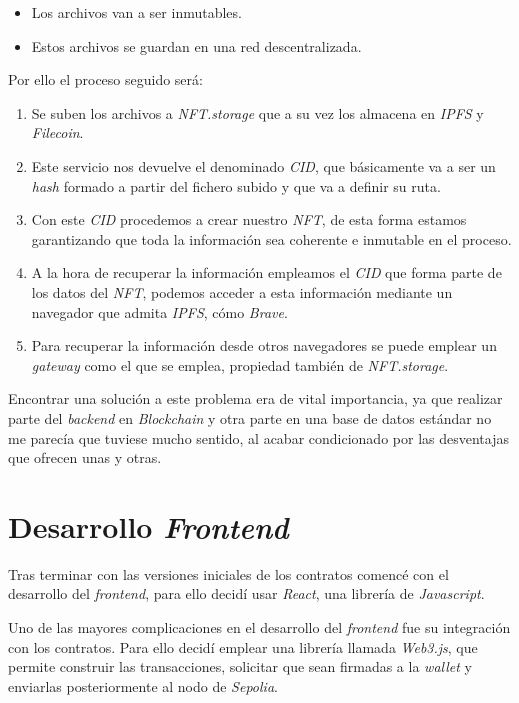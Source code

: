 \begin{itemize}
    \item Los archivos van a ser inmutables.
    \item Estos archivos se guardan en una red descentralizada.
\end{itemize}

Por ello el proceso seguido será:

\begin{enumerate}
    \item Se suben los archivos a \textit{NFT.storage} que a su vez los almacena en \textit{IPFS} y \textit{Filecoin}.
    \item Este servicio nos devuelve el denominado \textit{CID}, que básicamente va a ser un \textit{hash} formado a partir del fichero subido y que va a definir su ruta.
    \item Con este \textit{CID} procedemos a crear nuestro \textit{NFT}, de esta forma estamos garantizando que toda la información sea coherente e inmutable en el proceso.
    \item A la hora de recuperar la información empleamos el \textit{CID} que forma parte de los datos del \textit{NFT}, podemos acceder a esta información mediante un navegador que admita \textit{IPFS}, cómo \textit{Brave}.
    \item Para recuperar la información desde otros navegadores se puede emplear un \textit{gateway} como el que se emplea, propiedad también de  \textit{NFT.storage}.
\end{enumerate}

Encontrar una solución a este problema era de vital importancia, ya que realizar parte del \textit{backend} en \textit{Blockchain} y otra parte en una base de datos estándar no me parecía que tuviese mucho sentido, al acabar condicionado por las desventajas que ofrecen unas y otras.

\section{Desarrollo \textit{Frontend}}

Tras terminar con las versiones iniciales de los contratos comencé con el desarrollo del \textit{frontend}, para ello decidí usar \textit{React}, una librería de \textit{Javascript}.

Uno de las mayores complicaciones en el desarrollo del \textit{frontend} fue su integración con los contratos. Para ello decidí emplear una librería llamada \textit{Web3.js}, que permite construir las transacciones, solicitar que sean firmadas a la \textit{wallet} y enviarlas posteriormente al nodo de \textit{Sepolia}.

